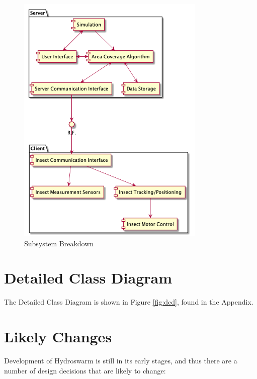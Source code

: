 \documentclass[11pt]{article}
\begin{document}
\begin{figure}[H]
   \centering
   \includegraphics[width=0.8\textwidth]{diagram/component-diagram.png}
   \caption{Subsystem Breakdown}
   \label{fig:sub}
\end{figure}

\section{Detailed Class Diagram}
The Detailed Class Diagram is shown in Figure \ref{fig:dcd}, found in the Appendix.

\section{Likely Changes}
Development of Hydroswarm is still in its early stages, and thus there are a number of design decisions that
are likely to change:
\end{document}
